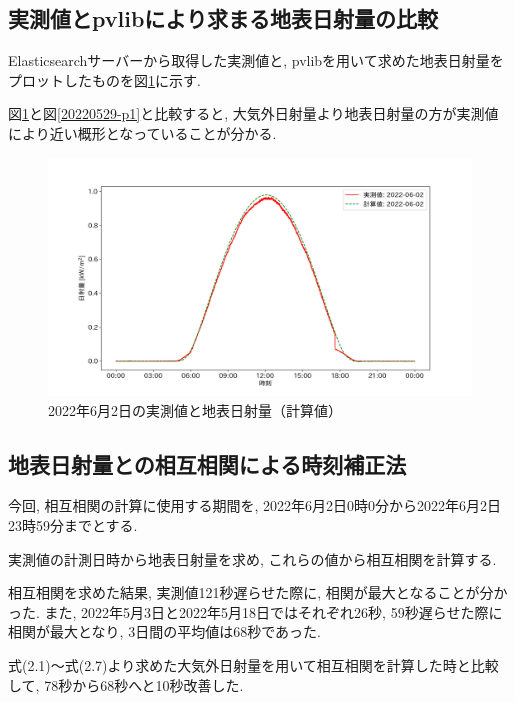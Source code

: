 \subsection{実測値とpvlibにより求まる地表日射量の比較}
Elasticsearchサーバーから取得した実測値と, pvlibを用いて求めた地表日射量をプロットしたものを図\ref{2-p1}に示す.

図\ref{2-p1}と図\ref{20220529-p1}と比較すると, 大気外日射量より地表日射量の方が実測値により近い概形となっていることが分かる.

\begin{figure}[H]
  \begin{center}
    \includegraphics[width=160mm]{sotu/figure/2/pvlib-20220602-corr.png}
    \caption{2022年6月2日の実測値と地表日射量（計算値）}
    \label{2-p1}
  \end{center}
\end{figure}

\subsection{地表日射量との相互相関による時刻補正法}
今回, 相互相関の計算に使用する期間を, 2022年6月2日0時0分から2022年6月2日23時59分までとする.

実測値の計測日時から地表日射量を求め, これらの値から相互相関を計算する.

相互相関を求めた結果, 実測値121秒遅らせた際に, 相関が最大となることが分かった.  また, 2022年5月3日と2022年5月18日ではそれぞれ26秒, 59秒遅らせた際に相関が最大となり, 3日間の平均値は68秒であった.

式(2.1)～式(2.7)より求めた大気外日射量を用いて相互相関を計算した時と比較して, 78秒から68秒へと10秒改善した.

